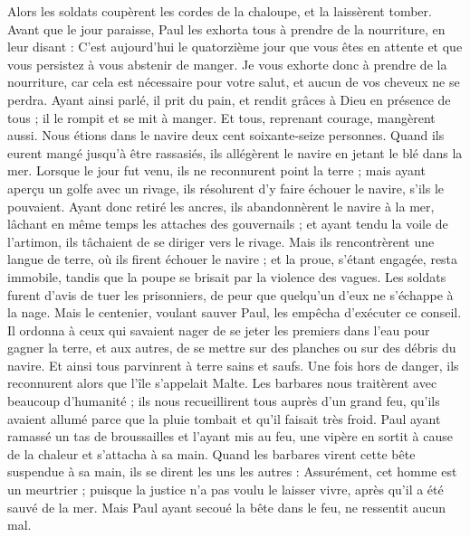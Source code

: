 \begin{multicols}{2}
Alors les soldats coupèrent les cordes de la chaloupe, et la laissèrent tomber.
Avant que le jour paraisse, Paul les exhorta tous à prendre de la nourriture, en leur disant : C’est aujourd'hui le quatorzième jour que vous êtes en attente et que vous persistez à vous abstenir de manger.
Je vous exhorte donc à prendre de la nourriture, car cela est nécessaire pour votre salut, et aucun de vos cheveux ne se perdra.
Ayant ainsi parlé, il prit du pain, et rendit grâces à Dieu en présence de tous ; il le rompit et se mit à manger.
Et tous, reprenant courage, mangèrent aussi.
Nous étions dans le navire deux cent soixante-seize personnes.
Quand ils eurent mangé jusqu'à être rassasiés, ils allégèrent le navire en jetant le blé dans la mer.
Lorsque le jour fut venu, ils ne reconnurent point la terre ; mais ayant aperçu un golfe avec un rivage, ils résolurent d'y faire échouer le navire, s’ils le pouvaient.
Ayant donc retiré les ancres, ils abandonnèrent le navire à la mer, lâchant en même temps les attaches des gouvernails ; et ayant tendu la voile de l'artimon, ils tâchaient de se diriger vers le rivage.
Mais ils rencontrèrent une langue de terre, où ils firent échouer le navire ; et la proue, s’étant engagée, resta immobile, tandis que la poupe se brisait par la violence des vagues.
Les soldats furent d’avis de tuer les prisonniers, de peur que quelqu’un d’eux ne s’échappe à la nage.
Mais le centenier, voulant sauver Paul, les empêcha d'exécuter ce conseil. Il ordonna à ceux qui savaient nager de se jeter les premiers dans l’eau pour gagner la terre,
et aux autres, de se mettre sur des planches ou sur des débris du navire. Et ainsi tous parvinrent à terre sains et saufs.
\VerseOne{}Une fois hors de danger, ils reconnurent alors que l'île s'appelait Malte.
Les barbares nous traitèrent avec beaucoup d’humanité ; ils nous recueillirent tous auprès d’un grand feu, qu’ils avaient allumé parce que la pluie tombait et qu’il faisait très froid.
Paul ayant ramassé un tas de broussailles et l’ayant mis au feu, une vipère en sortit à cause de la chaleur et s’attacha à sa main.
Quand les barbares virent cette bête suspendue à sa main, ils se dirent les uns les autres : Assurément, cet homme est un meurtrier ; puisque la justice n’a pas voulu le laisser vivre, après qu’il a été sauvé de la mer.
Mais Paul ayant secoué la bête dans le feu, ne ressentit aucun mal.

\end{multicols}
